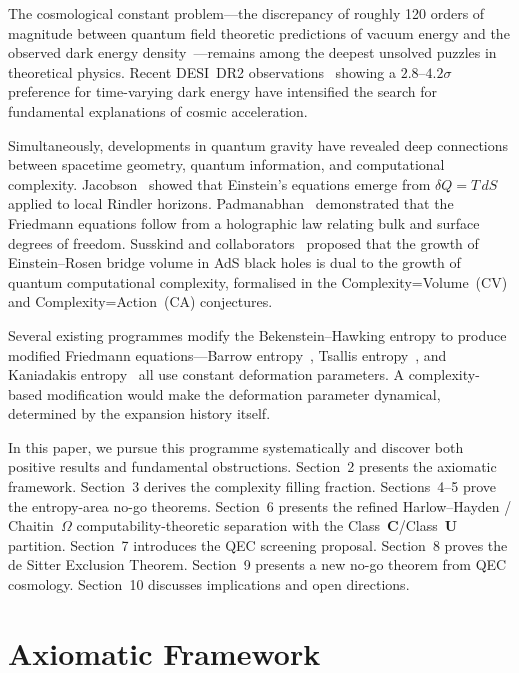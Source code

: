 \documentclass[12pt,a4paper]{article}
\theoremstyle{remark}
\begin{document}
The cosmological constant problem---the discrepancy of roughly 120 orders of magnitude between quantum field theoretic predictions of vacuum energy and the observed dark energy density~\cite{Weinberg1989}---remains among the deepest unsolved puzzles in theoretical physics.
Recent DESI~DR2 observations~\cite{DESI2025} showing a $2.8$--$4.2\sigma$ preference for time-varying dark energy have intensified the search for fundamental explanations of cosmic acceleration.

Simultaneously, developments in quantum gravity have revealed deep connections between spacetime geometry, quantum information, and computational complexity.
Jacobson~\cite{Jacobson1995} showed that Einstein's equations emerge from $\delta Q = T\,dS$ applied to local Rindler horizons.
Padmanabhan~\cite{Padmanabhan2012} demonstrated that the Friedmann equations follow from a holographic law relating bulk and surface degrees of freedom.
Susskind and collaborators~\cite{Susskind2016,Brown2016} proposed that the growth of Einstein--Rosen bridge volume in AdS black holes is dual to the growth of quantum computational complexity, formalised in the Complexity=Volume~(CV) and Complexity=Action~(CA) conjectures.

Several existing programmes modify the Bekenstein--Hawking entropy to produce modified Friedmann equations---Barrow entropy~\cite{Barrow2020}, Tsallis entropy~\cite{Tsallis2013}, and Kaniadakis entropy~\cite{Kaniadakis2002} all use constant deformation parameters.
A complexity-based modification would make the deformation parameter dynamical, determined by the expansion history itself.

In this paper, we pursue this programme systematically and discover both positive results and fundamental obstructions.
Section~2 presents the axiomatic framework.
Section~3 derives the complexity filling fraction.
Sections~4--5 prove the entropy-area no-go theorems.
Section~6 presents the refined Harlow--Hayden / Chaitin~$\Omega$ computability-theoretic separation with the Class~$\mathbf{C}$/Class~$\mathbf{U}$ partition.
Section~7 introduces the QEC screening proposal.
Section~8 proves the de Sitter Exclusion Theorem.
Section~9 presents a new no-go theorem from QEC cosmology.
Section~10 discusses implications and open directions.

\section{Axiomatic Framework}
\end{document}
